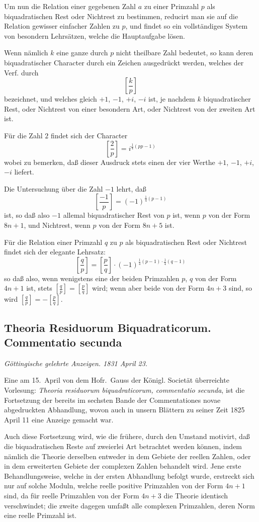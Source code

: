 \documentclass[12pt,a4paper]{article}
\theoremstyle{plain}
\theoremstyle{definition}
\theoremstyle{remark}
\begin{document}
Um nun die Relation einer gegebenen Zahl $a$ zu einer Primzahl $p$ als biquadratischen Rest oder Nichtrest zu bestimmen, reducirt man sie auf die Relation gewisser einfacher Zahlen zu $p$, und findet so ein vollständiges System von besondern Lehrsätzen, welche die Hauptaufgabe lösen.

Wenn nämlich $k$ eine ganze durch $p$ nicht theilbare Zahl bedeutet, so kann deren biquadratischer Character durch ein Zeichen ausgedrückt werden, welches der Verf. durch
\[
\left[\frac{k}{p}\right]
\]
bezeichnet, und welches gleich $+1$, $-1$, $+i$, $-i$ ist, je nachdem $k$ biquadratischer Rest, oder Nichtrest von einer besondern Art, oder Nichtrest von der zweiten Art ist.

Für die Zahl $2$ findet sich der Character
\[
\left[\frac{2}{p}\right] = i^{\frac{1}{4}(pp-1)}
\]
wobei zu bemerken, daß dieser Ausdruck stets einen der vier Werthe $+1$, $-1$, $+i$, $-i$ liefert.

Die Untersuchung über die Zahl $-1$ lehrt, daß
\[
\left[\frac{-1}{p}\right] = (-1)^{\frac{1}{4}(p-1)}
\]
ist, so daß also $-1$ allemal biquadratischer Rest von $p$ ist, wenn $p$ von der Form $8n+1$, und Nichtrest, wenn $p$ von der Form $8n+5$ ist.

Für die Relation einer Primzahl $q$ zu $p$ als biquadratischen Rest oder Nichtrest findet sich der elegante Lehrsatz:
\[
\left[\frac{q}{p}\right] = \left[\frac{p}{q}\right] \cdot (-1)^{\frac{1}{4}(p-1) \cdot \frac{1}{4}(q-1)}
\]
so daß also, wenn wenigstens eine der beiden Primzahlen $p$, $q$ von der Form $4n+1$ ist, stets $\left[\frac{q}{p}\right] = \left[\frac{p}{q}\right]$ wird; wenn aber beide von der Form $4n+3$ sind, so wird $\left[\frac{q}{p}\right] = -\left[\frac{p}{q}\right]$.

\subsection*{Theoria Residuorum Biquadraticorum. Commentatio secunda}

\textit{Göttingische gelehrte Anzeigen. 1831 April 23.}

Eine am 15.~April von dem Hofr.~Gauss der Königl. Societät überreichte Vorlesung: \textit{Theoria residuorum biquadraticorum, commentatio secunda}, ist die Fortsetzung der bereits im sechsten Bande der Commentationes novae abgedruckten Abhandlung, wovon auch in unsern Blättern zu seiner Zeit 1825 April 11 eine Anzeige gemacht war.

Auch diese Fortsetzung wird, wie die frühere, durch den Umstand motivirt, daß die biquadratischen Reste auf zweierlei Art betrachtet werden können, indem nämlich die Theorie derselben entweder in dem Gebiete der reellen Zahlen, oder in dem erweiterten Gebiete der complexen Zahlen behandelt wird. Jene erste Behandlungsweise, welche in der ersten Abhandlung befolgt wurde, erstreckt sich nur auf solche Moduln, welche reelle positive Primzahlen von der Form $4n+1$ sind, da für reelle Primzahlen von der Form $4n+3$ die Theorie identisch verschwindet; die zweite dagegen umfaßt alle complexen Primzahlen, deren Norm eine reelle Primzahl ist.
\end{document}

